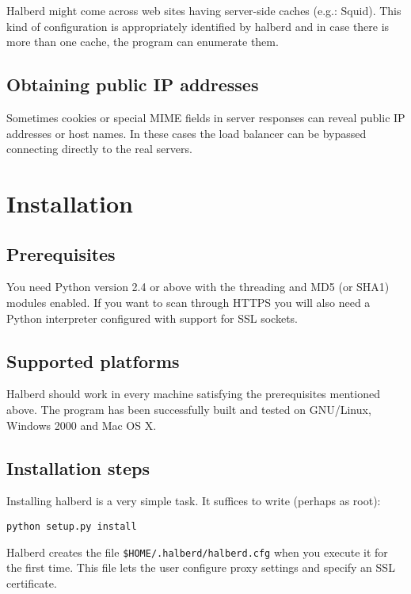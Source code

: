 \documentclass[a4paper]{book}
\begin{document}
Halberd might come across web sites having server-side caches (e.g.: Squid).
This kind of configuration is appropriately identified by halberd and in case
there is more than one cache, the program can enumerate them.

\section{Obtaining public IP addresses}

Sometimes cookies or special MIME fields in server responses can reveal public
IP addresses or host names. In these cases the load balancer can be bypassed
connecting directly to the real servers.

\chapter{Installation}

\section{Prerequisites}

You need Python version 2.4 or above with the threading and MD5 (or SHA1)
modules enabled.  If you want to scan through HTTPS you will also need a Python
interpreter configured with support for SSL sockets.

\section{Supported platforms}

Halberd should work in every machine satisfying the prerequisites mentioned
above.  The program has been successfully built and tested on GNU/Linux, Windows
2000 and Mac OS X.

\section{Installation steps}

Installing halberd is a very simple task.  It suffices to write (perhaps as
root):

\begin{verbatim}
python setup.py install
\end{verbatim}

Halberd creates the file \verb|$HOME/.halberd/halberd.cfg| when you execute it
for the first time.  This file lets the user configure proxy settings and
specify an SSL certificate.
\end{document}
